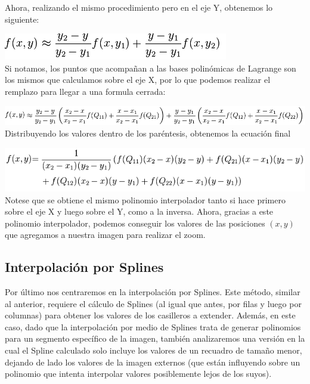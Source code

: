 Ahora, realizando el mismo procedimiento pero en el eje Y, obtenemos lo siguiente:

\includegraphics[scale=0.75]{imagenes/bilinealY.png}\\

Si notamos, los puntos que acompañan a las bases polinómicas de Lagrange son los mismos que calculamos sobre el eje X, por lo que podemos realizar el remplazo para llegar a una formula cerrada:

\includegraphics[scale=0.75]{imagenes/bilinealXY.png}\\

Distribuyendo los valores dentro de los paréntesis, obtenemos la ecuación final

\includegraphics[scale=0.75]{imagenes/bilinealFinal.png}\\

Notese que se obtiene el mismo polinomio interpolador tanto si hace primero sobre el eje X y luego sobre el Y, como a la inversa. Ahora, gracias a este polinomio interpolador, podemos conseguir los valores de las posiciones $(x,y)$ que agregamos a nuestra imagen para realizar el zoom.

\subsection{Interpolación por Splines}
Por último nos centraremos en la interpolación por Splines. Este método, similar al anterior, requiere el cálculo de Splines (al igual que antes, por filas y luego por columnas) para obtener los valores de los casilleros a extender.
Además, en este caso, dado que la interpolación por medio de Splines trata de generar polinomios para un segmento
específico de la imagen, también analizaremos una versión en la cual el Spline calculado solo incluye los valores de un recuadro de tamaño menor, dejando de lado los valores de la imagen externos (que están influyendo sobre un polinomio que intenta interpolar valores posiblemente lejos de los suyos).

